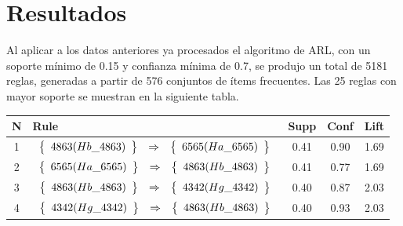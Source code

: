 \section{Resultados}

Al aplicar a los datos anteriores ya procesados el algoritmo de ARL, con un soporte mínimo de 0.15 y confianza mínima de 0.7, se produjo un total de 5181 reglas, generadas a partir de 576 conjuntos de ítems frecuentes. Las 25 reglas con mayor soporte se muestran en la siguiente tabla.

\begin{longtable}{| c | l | c | c | c |}
\hline
\textbf{N} & \textbf{Rule} & \textbf{Supp} & \textbf{Conf} & \textbf{Lift} \\ \hline
1 & $\begin{array}{c c c}\left\{\begin{array}{c}4863 (Hb\_4863)\end{array}\right\} & \Rightarrow & \left\{\begin{array}{c}6565 (Ha\_6565)\end{array}\right\}\end{array}$ & 0.41 & 0.90 & 1.69 \\ \hline
2 & $\begin{array}{c c c}\left\{\begin{array}{c}6565 (Ha\_6565)\end{array}\right\} & \Rightarrow & \left\{\begin{array}{c}4863 (Hb\_4863)\end{array}\right\}\end{array}$ & 0.41 & 0.77 & 1.69 \\ \hline
3 & $\begin{array}{c c c}\left\{\begin{array}{c}4863 (Hb\_4863)\end{array}\right\} & \Rightarrow & \left\{\begin{array}{c}4342 (Hg\_4342)\end{array}\right\}\end{array}$ & 0.40 & 0.87 & 2.03 \\ \hline
4 & $\begin{array}{c c c}\left\{\begin{array}{c}4342 (Hg\_4342)\end{array}\right\} & \Rightarrow & \left\{\begin{array}{c}4863 (Hb\_4863)\end{array}\right\}\end{array}$ & 0.40 & 0.93 & 2.03 \\ \hline

\end{longtable}
